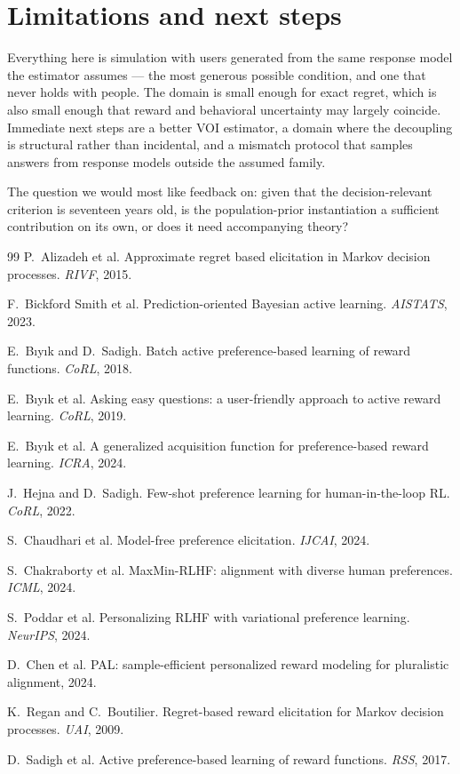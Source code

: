 \documentclass[10pt]{article}
\begin{document}
\section{Limitations and next steps}

Everything here is simulation with users generated from the same response model
the estimator assumes --- the most generous possible condition, and one that
never holds with people. The domain is small enough for exact regret, which is
also small enough that reward and behavioral uncertainty may largely coincide.
Immediate next steps are a better VOI estimator, a domain where the decoupling
is structural rather than incidental, and a mismatch protocol that samples
answers from response models outside the assumed family.

The question we would most like feedback on: given that the decision-relevant
criterion is seventeen years old, is the population-prior instantiation a
sufficient contribution on its own, or does it need accompanying theory?


\begin{thebibliography}{99}
\small
{} P.~Alizadeh et al.
Approximate regret based elicitation in Markov decision processes. \emph{RIVF}, 2015.

 F.~Bickford Smith et al.
Prediction-oriented Bayesian active learning. \emph{AISTATS}, 2023.

 E.~B\i y\i k and D.~Sadigh.
Batch active preference-based learning of reward functions. \emph{CoRL}, 2018.

 E.~B\i y\i k et al.
Asking easy questions: a user-friendly approach to active reward learning.
\emph{CoRL}, 2019.

 E.~B\i y\i k et al.
A generalized acquisition function for preference-based reward learning.
\emph{ICRA}, 2024.

 J.~Hejna and D.~Sadigh.
Few-shot preference learning for human-in-the-loop RL. \emph{CoRL}, 2022.

 S.~Chaudhari et al.
Model-free preference elicitation. \emph{IJCAI}, 2024.

 S.~Chakraborty et al.
MaxMin-RLHF: alignment with diverse human preferences. \emph{ICML}, 2024.

 S.~Poddar et al.
Personalizing RLHF with variational preference learning. \emph{NeurIPS}, 2024.

 D.~Chen et al.
PAL: sample-efficient personalized reward modeling for pluralistic alignment,
2024.

 K.~Regan and C.~Boutilier.
Regret-based reward elicitation for Markov decision processes. \emph{UAI}, 2009.

 D.~Sadigh et al.
Active preference-based learning of reward functions. \emph{RSS}, 2017.
\end{thebibliography}
\end{document}
